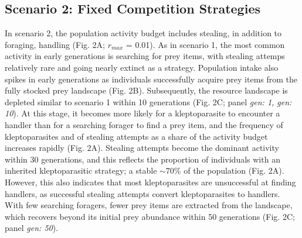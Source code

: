\documentclass[11pt]{article}
\begin{document}
\subsection{Scenario 2: Fixed Competition Strategies}

In scenario 2, the population activity budget includes stealing, in addition to foraging, handling (Fig. 2A; $r_{max}$ = 0.01).
As in scenario 1, the most common activity in early generations is searching for prey items, with stealing attemps relatively rare and going nearly extinct as a strategy.
Population intake also spikes in early generations as individuals successfully acquire prey items from the fully stocked prey landscape (Fig. 2B).
Subsequently, the resource landscape is depleted similar to scenario 1 within 10 generations (Fig. 2C; panel \textit{gen: 1, gen: 10}).
At this stage, it becomes more likely for a kleptoparasite to encounter a handler than for a searching forager to find a prey item, and the frequency of kleptoparasites and of stealing attempts as a share of the activity budget increases rapidly (Fig. 2A).
Stealing attempts become the dominant activity within 30 generations, and this reflects the proportion of individuals with an inherited kleptoparasitic strategy; a stable $\sim$70\% of the population (Fig. 2A).
However, this also indicates that most kleptoparasites are unsuccessful at finding handlers, as successful stealing attempts convert kleptoparasites to handlers.
With few searching foragers, fewer prey items are extracted from the landscape, which recovers beyond its initial prey abundance within 50 generations (Fig. 2C; panel \textit{gen: 50}).
\end{document}
